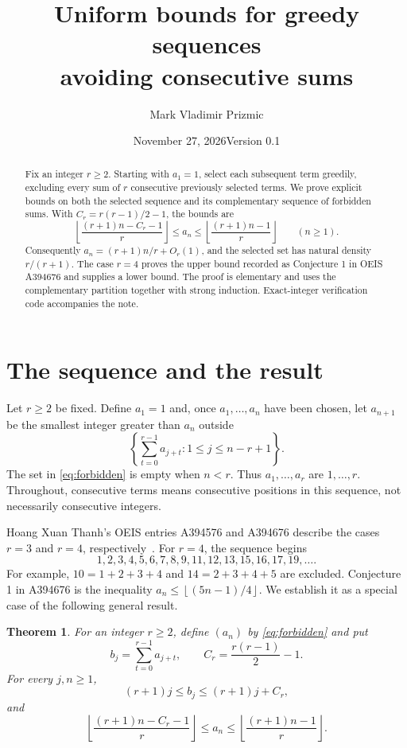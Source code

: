 \documentclass[11pt]{article}
\title{Uniform bounds for greedy sequences\\avoiding consecutive sums}
\author{Mark Vladimir Prizmic}
\date{November 27, 2026\quad\textnormal{\small Version 0.1}}
\newtheorem{theorem}{Theorem}
\theoremstyle{remark}
\newcommand{\floor}[1]{\left\lfloor #1\right\rfloor}
\begin{document}
\maketitle

\begin{abstract}
Fix an integer $r\ge2$. Starting with $a_1=1$, select each subsequent term
greedily, excluding every sum of $r$ consecutive previously selected terms.
We prove explicit bounds on both the selected sequence and its complementary
sequence of forbidden sums. With $C_r=r(r-1)/2-1$, the bounds are
\[
\floor{\frac{(r+1)n-C_r-1}{r}}
\le a_n\le
\floor{\frac{(r+1)n-1}{r}}\qquad(n\ge1).
\]
Consequently $a_n=(r+1)n/r+O_r(1)$, and the selected set has natural density
$r/(r+1)$. The case $r=4$ proves the upper bound recorded as Conjecture 1
in OEIS A394676 and supplies a lower bound. The proof is elementary and uses
the complementary partition together with strong induction. Exact-integer
verification code accompanies the note.
\end{abstract}

\section{The sequence and the result}

Let $r\ge2$ be fixed. Define $a_1=1$ and, once $a_1,\ldots,a_n$ have been
chosen, let $a_{n+1}$ be the smallest integer greater than $a_n$ outside
\begin{equation}\label{eq:forbidden}
\left\{\sum_{t=0}^{r-1}a_{j+t}:1\le j\le n-r+1\right\}.
\end{equation}
The set in \eqref{eq:forbidden} is empty when $n<r$. Thus $a_1,\ldots,a_r$
are $1,\ldots,r$. Throughout, consecutive terms means consecutive positions
in this sequence, not necessarily consecutive integers.

Hoang Xuan Thanh's OEIS entries A394576 and A394676 describe the cases
$r=3$ and $r=4$, respectively~\cite{oeis3,oeis4}. For $r=4$, the sequence
begins
\[
1,2,3,4,5,6,7,8,9,11,12,13,15,16,17,19,\ldots.
\]
For example, $10=1+2+3+4$ and $14=2+3+4+5$ are excluded.
Conjecture 1 in A394676 is the inequality
$a_n\le\floor{(5n-1)/4}$. We establish it as a special case of the following
general result.

\begin{theorem}\label{thm:main}
For an integer $r\ge2$, define $(a_n)$ by \eqref{eq:forbidden} and put
\[
b_j=\sum_{t=0}^{r-1}a_{j+t},\qquad C_r=\frac{r(r-1)}2-1.
\]
For every $j,n\ge1$,
\begin{equation}\label{eq:b-bounds}
(r+1)j\le b_j\le(r+1)j+C_r,
\end{equation}
and
\begin{equation}\label{eq:a-bounds}
\floor{\frac{(r+1)n-C_r-1}{r}}
\le a_n\le
\floor{\frac{(r+1)n-1}{r}}.
\end{equation}
\end{theorem}
\end{document}
